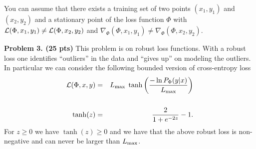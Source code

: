 \documentclass{article}
\newcommand{\solution}[1]{}
\begin{document}
\medskip
You can assume that there exists a training set of two points $(x_1,y_1)$ and $(x_2,y_2)$ and a stationary point of the loss
function $\Phi$ with ${\cal L}(\Phi,x_1,y_1) \not =  {\cal L}(\Phi,x_2,y_2)$ and $\nabla_\Phi(\Phi,x_1,y_1) \not = \nabla_\Phi(\Phi,x_2,y_2)$.

\solution{No, the expected update can be non-zero at a stationary point of the loss function.  Weighing the updates by something that depends on the draw of $(x,y)$ effectively changes the weighting on the training points
  which changes the stationarity condition.  Writing this in English counts as a correct solution. A formal counter example can be given using the assumed conditions:
\begin{eqnarray*}
  & & E_{(x,y) \sim \train} \;\;\eta\;{\cal L}(\Phi,x,y)\;\;\nabla_\Phi \;{\cal L}(\Phi,x,y)  \\
  \\
  & = & \eta \; \frac{1}{2}\left({\cal L}(\Phi,x_1,y_1)\;\left(\nabla_\Phi \;{\cal L}(\Phi,x_1,y_1)\right) + {\cal L}(\Phi,x_2,y_2)\;\left(\nabla_\Phi \;{\cal L}(\Phi,x_2,y_2)\right)\right) \\
  \\
  & = & \eta \; \frac{1}{2}\left({\cal L}_1\;\left(\nabla_\Phi \;{\cal L}(\Phi,x_2,y_2)\right) + {\cal L}_2\;\left(\nabla_\Phi \;{\cal L}(\Phi,x_2,y_2)\right)\right) \\
  \\
  & = & \eta ({\cal L}_1 + {\cal L}_2) \; \frac{1}{2}\left(\frac{{\cal L}_1}{{\cal L}_1 + {\cal L}_2}\;\left(\nabla_\Phi \;{\cal L}(\Phi,x_2,y_2)\right) + \frac{{\cal L}_2}{{\cal L}_1 + {\cal L}_2}\;\left(\nabla_\Phi \;{\cal L}(\Phi,x_2,y_2)\right)\right) \\
    \\
    & \not = & \eta \;({\cal L}_1 + {\cal L}_2) \frac{1}{2}\left(\;\nabla_\Phi \;{\cal L}(\Phi,x_1,y_1) + \nabla_\Phi \;{\cal L}(\Phi,x_2,y_2)\right) \\
    \\
    & = & 0
  \end{eqnarray*}

In Adam and RMSProp we have a weighting that depends on a moving average of the second moment of the gradients.  This is essentially a weighting that depends on a random draw over the training data.
It has been shown that stationary points of Adam and RMSProp updates do not necessarily correspond to stationary points of the loss function.
}
    
\bigskip
{\bf Problem 3. (25 pts)} This problem is on robust loss functions.  With a robust loss one identifies ``outliers'' in the data and ``gives up'' on modeling the outliers.
In particular we can consider the following bounded version of cross-entropy loss
\begin{eqnarray*}
  {\cal L}(\Phi,x,y) & = & L_{\max} \;\tanh \left(\frac{- \ln P_\Phi(y|x)}{L_{\max}}\right) \\
  \\
  \tanh(z) & = & \frac{2}{1+e^{-2z}} - 1.
\end{eqnarray*}
For $z \geq 0$ we have $\tanh(z) \geq 0$ and we have that the above robust loss is non-negative and can never be larger than $L_{\max}$.
\end{document}
